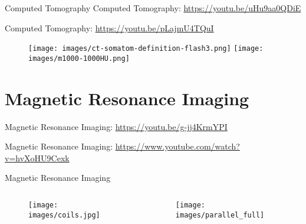 \begin{frame}[c]{Computed Tomography}
	Computed Tomography: \href{https://youtu.be/uHu9aa0QDiE}{https://youtu.be/uHu9aa0QDiE}

	Computed Tomography: \href{https://youtu.be/pLajmU4TQuI}{https://youtu.be/pLajmU4TQuI}
	\begin{figure}
		\texttt{[image: images/ct-somatom-definition-flash3.png]}
		\hspace*{.25cm}
		\texttt{[image: images/m1000-1000HU.png]}
	\end{figure}
\end{frame}

\subtitle{Motivation - Part 2}
\frame[plain,c]{\titlepage}

\section{Magnetic Resonance Imaging}
Magnetic Resonance Imaging: \href{https://youtu.be/g-jj4KrmYPI}{https://youtu.be/g-jj4KrmYPI}

Magnetic Resonance Imaging: \href{https://www.youtube.com/watch?v=hvXoHU9Cexk}{https://www.youtube.com/watch?v=hvXoHU9Cexk}
\begin{frame}[c]{Magnetic Resonance Imaging}
	\begin{columns}[c, onlytextwidth]
		\begin{column}{0.4\textwidth}
			\centering{}
			\begin{figure}[k]
				\centering

				\texttt{[image: images/coils.jpg]}
			\end{figure}
		\end{column}\begin{column}{0.4\textwidth}
			\begin{figure}[]
				\texttt{[image: images/parallel\_full]}
			\end{figure}
		\end{column}
	\end{columns}

\end{frame}


